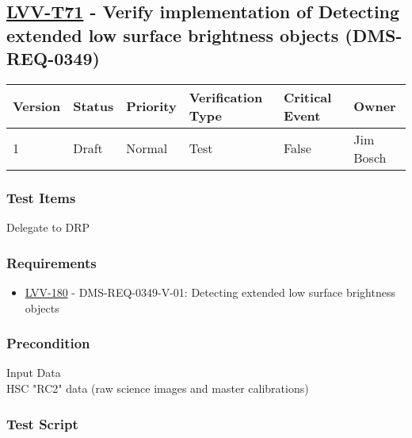 \hypertarget{lvv-t71---verify-implementation-of-detecting-extended-low-surface-brightness-objects-dms-req-0349}{%
\subsection{\texorpdfstring{\href{https://jira.lsstcorp.org/secure/Tests.jspa\#/testCase/LVV-T71}{LVV-T71}
- Verify implementation of Detecting extended low surface brightness
objects
(DMS-REQ-0349)}{LVV-T71 - Verify implementation of Detecting extended low surface brightness objects (DMS-REQ-0349)}}\label{lvv-t71---verify-implementation-of-detecting-extended-low-surface-brightness-objects-dms-req-0349}}

\begin{longtable}[]{@{}llllll@{}}
\toprule
Version & Status & Priority & Verification Type & Critical Event &
Owner\tabularnewline
\midrule
\endhead
1 & Draft & Normal & Test & False & Jim Bosch\tabularnewline
\bottomrule
\end{longtable}

\hypertarget{test-items-47}{%
\subsubsection{Test Items}\label{test-items-47}}

Delegate to DRP

\hypertarget{requirements-48}{%
\subsubsection{Requirements}\label{requirements-48}}

\begin{itemize}
\tightlist
\item
  \href{https://jira.lsstcorp.org/browse/LVV-180}{LVV-180} -
  DMS-REQ-0349-V-01: Detecting extended low surface brightness objects
\end{itemize}

\hypertarget{precondition-6}{%
\subsubsection{Precondition}\label{precondition-6}}

Input Data\\
HSC "RC2" data (raw science images and master calibrations)

\hypertarget{test-script-48}{%
\subsubsection{Test Script}\label{test-script-48}}

